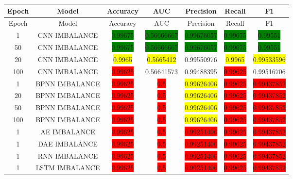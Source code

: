   	\begin{longtable}{|c|c|c|c|c|c|c|}
  		\hline
  		Epoch & Model & Accuracy & AUC & Precision & Recall & F1\\ \hline
  		\endfirsthead
  		\hline
  		Epoch & Model & Accuracy & AUC & Precision & Recall & F1\\ \hline
  		\endhead
  		1 & CNN IMBALANCE & \colorbox{green}{0.99675} & \colorbox{green}{0.56666667} & \colorbox{green}{0.99676057} & \colorbox{green}{0.99675} & \colorbox{green}{0.99551}\\ \hline
  		50 & CNN IMBALANCE & \colorbox{green}{0.99675} & \colorbox{green}{0.56666667} & \colorbox{green}{0.99676057} & \colorbox{green}{0.99675} & \colorbox{green}{0.99551}\\ \hline
  		20 & CNN IMBALANCE & \colorbox{yellow}{0.9965} & \colorbox{yellow}{0.5665412} & 0.99550976 & \colorbox{yellow}{0.9965} & \colorbox{yellow}{0.99533596}\\ \hline
  		100 & CNN IMBALANCE & \colorbox{red}{0.99625} & 0.56641573 & 0.99488395 & \colorbox{red}{0.99625} & 0.99516706\\ \hline
  		1 & BPNN IMBALANCE & \colorbox{red}{0.99625} & \colorbox{red}{0.5} & \colorbox{yellow}{0.99626406} & \colorbox{red}{0.99625} & \colorbox{red}{0.99437852}\\ \hline
  		20 & BPNN IMBALANCE & \colorbox{red}{0.99625} & \colorbox{red}{0.5} & \colorbox{yellow}{0.99626406} & \colorbox{red}{0.99625} & \colorbox{red}{0.99437852}\\ \hline
  		50 & BPNN IMBALANCE & \colorbox{red}{0.99625} & \colorbox{red}{0.5} & \colorbox{yellow}{0.99626406} & \colorbox{red}{0.99625} & \colorbox{red}{0.99437852}\\ \hline
  		100 & BPNN IMBALANCE & \colorbox{red}{0.99625} & \colorbox{red}{0.5} & \colorbox{yellow}{0.99626406} & \colorbox{red}{0.99625} & \colorbox{red}{0.99437852}\\ \hline
  		1 & AE IMBALANCE & \colorbox{red}{0.99625} & \colorbox{red}{0.5} & \colorbox{red}{0.99251406} & \colorbox{red}{0.99625} & \colorbox{red}{0.99437852}\\ \hline
  		1 & DAE IMBALANCE & \colorbox{red}{0.99625} & \colorbox{red}{0.5} & \colorbox{red}{0.99251406} & \colorbox{red}{0.99625} & \colorbox{red}{0.99437852}\\ \hline
  		1 & RNN IMBALANCE & \colorbox{red}{0.99625} & \colorbox{red}{0.5} & \colorbox{red}{0.99251406} & \colorbox{red}{0.99625} & \colorbox{red}{0.99437852}\\ \hline
  		1 & LSTM IMBALANCE & \colorbox{red}{0.99625} & \colorbox{red}{0.5} & \colorbox{red}{0.99251406} & \colorbox{red}{0.99625} & \colorbox{red}{0.99437852}\\ \hline

\end{longtable}
